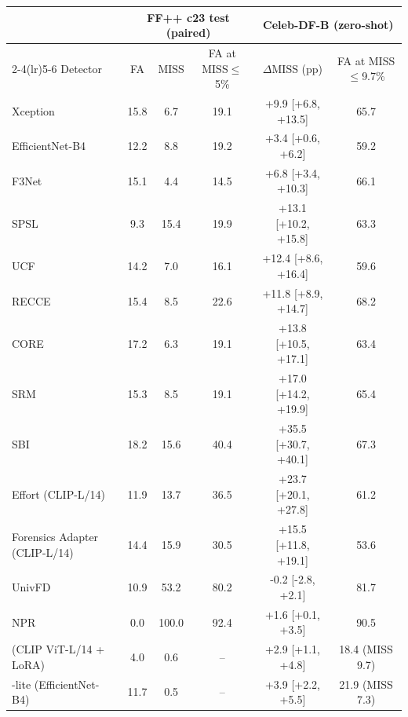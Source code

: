 \begin{tabular}{l cc c cc}
\toprule
 & \multicolumn{3}{c}{FF++ c23 test (paired)} & \multicolumn{2}{c}{Celeb-DF-B (zero-shot)} \\
\cmidrule(lr){2-4}\cmidrule(lr){5-6}
Detector & FA & MISS & FA at MISS$\le$5\% & $\Delta$MISS (pp) & FA at MISS$\le$9.7\% \\
\midrule
Xception & 15.8 & 6.7 & 19.1 & +9.9 [+6.8, +13.5] & 65.7 \\
EfficientNet-B4 & 12.2 & 8.8 & 19.2 & +3.4 [+0.6, +6.2] & 59.2 \\
F3Net & 15.1 & 4.4 & 14.5 & +6.8 [+3.4, +10.3] & 66.1 \\
SPSL & 9.3 & 15.4 & 19.9 & +13.1 [+10.2, +15.8] & 63.3 \\
UCF & 14.2 & 7.0 & 16.1 & +12.4 [+8.6, +16.4] & 59.6 \\
RECCE & 15.4 & 8.5 & 22.6 & +11.8 [+8.9, +14.7] & 68.2 \\
CORE & 17.2 & 6.3 & 19.1 & +13.8 [+10.5, +17.1] & 63.4 \\
SRM & 15.3 & 8.5 & 19.1 & +17.0 [+14.2, +19.9] & 65.4 \\
SBI & 18.2 & 15.6 & 40.4 & +35.5 [+30.7, +40.1] & 67.3 \\
Effort (CLIP-L/14) & 11.9 & 13.7 & 36.5 & +23.7 [+20.1, +27.8] & 61.2 \\
Forensics Adapter (CLIP-L/14) & 14.4 & 15.9 & 30.5 & +15.5 [+11.8, +19.1] & 53.6 \\
UnivFD & 10.9 & 53.2 & 80.2 & -0.2 [-2.8, +2.1] & 81.7 \\
NPR & 0.0 & 100.0 & 92.4 & +1.6 [+0.1, +3.5] & 90.5 \\
\midrule
\textbf{\ours{}} (CLIP ViT-L/14 + LoRA) & 4.0 & 0.6 & -- & +2.9 [+1.1, +4.8] & 18.4 (MISS 9.7) \\
\ours{}-lite (EfficientNet-B4) & 11.7 & 0.5 & -- & +3.9 [+2.2, +5.5] & 21.9 (MISS 7.3) \\
\bottomrule
\end{tabular}
